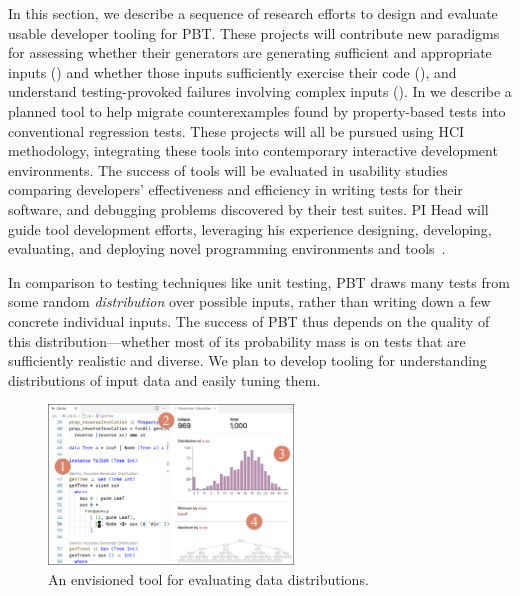 In this section, we
describe a sequence of research efforts to design and evaluate usable developer
tooling for PBT. These projects will contribute new paradigms for assessing whether their generators are generating sufficient and
appropriate inputs () and whether those
inputs sufficiently exercise their code (),
and understand testing-provoked failures involving complex inputs
().
%
In  we describe a planned tool to help migrate
counterexamples found by property-based tests into conventional
regression tests.
%
These projects will all be pursued using HCI
methodology, integrating these tools into contemporary interactive development
environments. The success of tools will be evaluated in usability studies
comparing developers' effectiveness and efficiency in writing tests for their
software, and debugging problems discovered by their test suites.  PI Head will
guide tool development efforts, leveraging his
experience designing, developing, evaluating, and deploying novel programming
environments and
tools~\cite{ref:head2015tutorons,ref:suzuki2017tracediff,ref:head2017writing,ref:head2018when,ref:head2018interactive,ref:head2019managing,ref:head2020composing}.

%
In comparison to testing techniques like unit testing, PBT draws many
tests from some
random {\em distribution} over possible inputs, rather than writing down a few
concrete individual inputs. The success  of
PBT thus depends on the quality of this distribution---whether
most of its probability mass is on tests that are sufficiently
realistic and diverse. We plan
to develop tooling for
understanding distributions of input data and easily tuning them.

\begin{figure}
  \centering
  \includegraphics[width=0.58\textwidth]{assets/gen-vis.pdf}
  \caption{An envisioned tool for evaluating data distributions.
    }\label{fig:gen-vis}
\end{figure}

